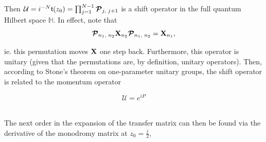 \documentclass{homework}
\begin{document}
Then $\mathcal{U} = i^{-N} \mathfrak{t}(z_0) = \prod_{j=1}^{N-1} \bm{\mathcal{P}}_{j, \textnormal{ } j+1}$ is a shift operator in the full quantum Hilbert space $\mathds{H}$. In effect, note that 
$$
 \bm{\mathcal{P}}_{n_1, \textnormal{ } n_2} {\bf X}_{n_2} \bm{\mathcal{P}}_{n_1, \textnormal{ } n_2} = {\bf X}_{n_1},
$$

ie. this permutation moves ${\bf X}$ one step back. Furthermore, this operator is unitary (given that the permutations are, by definition, unitary operators). Then, according to Stone's theorem on one-parameter unitary groups, the shift operator is related to the momentum operator 

\begin{equation}
    \mathcal{U} = e^{iP}
\end{equation}

\blanky \\

The next order in the expansion of the transfer matrix can then be found via the derivative of the monodromy matrix at $z_0 = \frac{i}{2}$, 
\end{document}
